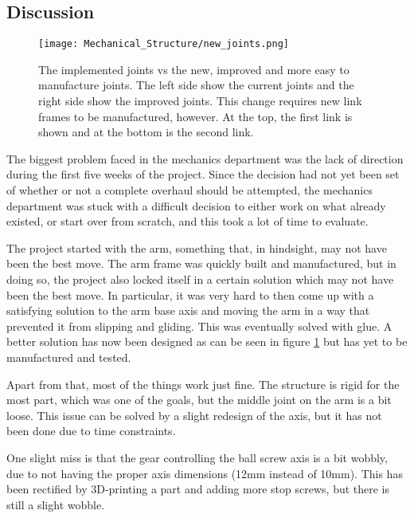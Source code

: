 
\subsection{Discussion}

\begin{figure}[!ht]
    \centering
    \texttt{[image: Mechanical\_Structure/new\_joints.png]}
    \caption{The implemented joints vs the new, improved and more easy to manufacture joints. The left side show the current joints and the right side show the improved joints. This change requires new link frames to be manufactured, however. At the top, the first link is shown and at the bottom is the second link.}
    \label{fig:new_joints}
\end{figure}

The biggest problem faced in the mechanics department was the lack of direction during the first five weeks of the project. Since the decision had not yet been set of whether or not a complete overhaul should be attempted, the mechanics department was stuck with a difficult decision to either work on what already existed, or start over from scratch, and this took a lot of time to evaluate.

The project started with the arm, something that, in hindsight, may not have been the best move. The arm frame was quickly built and manufactured, but in doing so, the project also locked itself in a certain solution which may not have been the best move. In particular, it was very hard to then come up with a satisfying solution to the arm base axis and moving the arm in a way that prevented it from slipping and gliding. This was eventually solved with glue. A better solution has now been designed as can be seen in figure \ref{fig:new_joints} but has yet to be manufactured and tested.

Apart from that, most of the things work just fine. The structure is rigid for the most part, which was one of the goals, but the middle joint on the arm is a bit loose. This issue can be solved by a slight redesign of the axis, but it has not been done due to time constraints.

One slight miss is that the gear controlling the ball screw axis is a bit wobbly, due to not having the proper axis dimensions (12mm instead of 10mm). This has been rectified by 3D-printing a part and adding more stop screws, but there is still a slight wobble.


